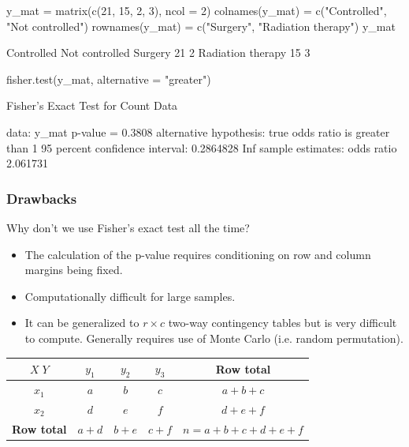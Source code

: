 \documentclass[a4paper]{article}\usepackage[]{graphicx}\usepackage[]{xcolor}
\begin{document}
\begin{Schunk}
\begin{Sinput}
y_mat = matrix(c(21, 15, 2, 3), ncol = 2)
colnames(y_mat) = c("Controlled", "Not controlled")
rownames(y_mat) = c("Surgery", "Radiation therapy")
y_mat
\end{Sinput}
\begin{Soutput}
                  Controlled Not controlled
Surgery                   21              2
Radiation therapy         15              3
\end{Soutput}
\begin{Sinput}
fisher.test(y_mat, alternative = "greater")
\end{Sinput}
\begin{Soutput}

	Fisher's Exact Test for Count Data

data:  y_mat
p-value = 0.3808
alternative hypothesis: true odds ratio is greater than 1
95 percent confidence interval:
 0.2864828       Inf
sample estimates:
odds ratio 
  2.061731 
\end{Soutput}
\end{Schunk}
\subsubsection{Drawbacks}
Why don't we use Fisher's exact test all the time?
\begin{itemize}
	\item The calculation of the p-value requires conditioning on row and column margins being fixed.
	\item Computationally difficult for large samples.
	\item It can be generalized to \( r \times c \) two-way contingency tables but is very difficult to compute. Generally requires use of Monte Carlo (i.e. random permutation).
\end{itemize}
\begin{table}[H]
	\centering
	\begin{tabular}{@{}c|ccc|c@{}}
	\toprule
	\( X \; Y \) 	   & \( y_1 \)   & \( y_2 \)   & \( y_3 \)   & \textbf{Row total}    \\ \midrule
	\( x_1 \)          & \( a \)     & \( b \)     & \( c \)     & \( a + b + c \)       \\
	\( x_2 \)          & \( d \)     & \( e \)     & \( f \)     & \( d + e + f \)       \\ \midrule
	\textbf{Row total} & \( a + d \) & \( b + e \) & \( c + f \) & \( n = a+b+c+d+e+f \) \\ \bottomrule
	\end{tabular}
\end{table}
\end{document}
